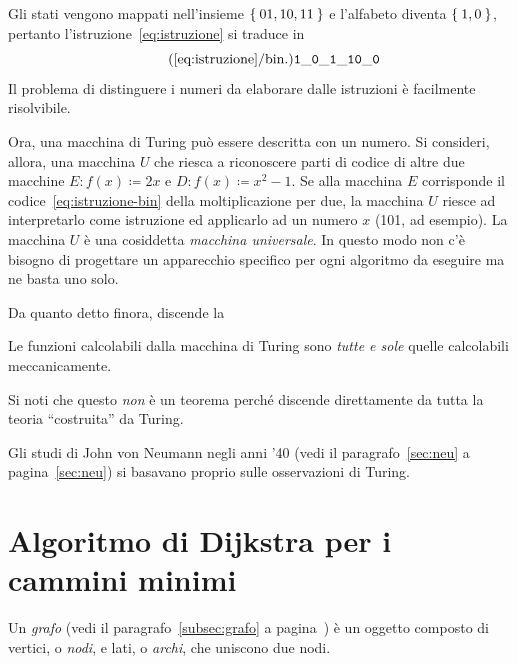 Gli stati vengono mappati nell'insieme $\Set{01,10,11}$ e l'alfabeto diventa $\Set{1,0}$, pertanto l'istruzione~\eqref{eq:istruzione} si traduce in
\begin{equation}\label{eq:istruzione-bin}\tag{\ref*{eq:istruzione}/bin.}
\mathtt{1\_0\_1\_10\_0}%
\end{equation}
Il problema di distinguere i numeri da elaborare dalle istruzioni è facilmente risolvibile.

Ora, una macchina di Turing può essere descritta con un numero.
Si consideri, allora, una macchina $U$ che riesca a riconoscere parti di codice di altre due macchine $E\colon f(x)\coloneqq2x$ e $D\colon f(x)\coloneqq x^2-1$.
Se alla macchina $E$ corrisponde il codice~\eqref{eq:istruzione-bin} della moltiplicazione per due, la macchina $U$ riesce ad interpretarlo come istruzione ed applicarlo ad un numero $x$ (\num[parse-numbers=false]{101}, ad esempio).
La macchina $U$ è una cosiddetta \emph{macchina universale}.
In questo modo non c'è bisogno di progettare un apparecchio specifico per ogni algoritmo da eseguire ma ne basta uno solo.


Da  quanto detto finora, discende la
\begin{thesis*}
Le funzioni calcolabili dalla macchina di Turing sono \emph{tutte e sole} quelle calcolabili meccanicamente.
\end{thesis*}
Si noti che questo \emph{non} è un teorema perché discende direttamente da tutta la teoria ``costruita'' da Turing.


Gli studi di John von Neumann negli anni '40 (vedi il paragrafo~\ref{sec:neu} a pagina~\ref{sec:neu}) si basavano proprio sulle osservazioni di Turing.


	\section{Algoritmo di Dijkstra per i cammini minimi}

Un \emph{grafo} (vedi il paragrafo~\ref{subsec:grafo} a pagina~\pageref{subsec:grafo}) è un oggetto composto di vertici, o \emph{nodi}, e lati, o \emph{archi}, che uniscono due nodi.


